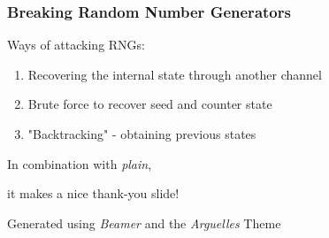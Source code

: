 \documentclass{beamer}
\begin{document}
  \begin{frame}
    \frametitle{Breaking Random Number Generators}

    Ways of attacking RNGs:
    \begin{enumerate}
        \item Recovering the internal state through another channel
        \item Brute force to recover seed and counter state
        \item "Backtracking" - obtaining previous states
    \end{enumerate}
  \end{frame}

   
  \ThankYou
  \begin{frame}
    In combination with \textit{plain},\par
    it makes a nice thank-you slide!

    \vfill{Generated using \textit{Beamer} and the \textit{Arguelles} Theme}
  \end{frame}
\end{document}
